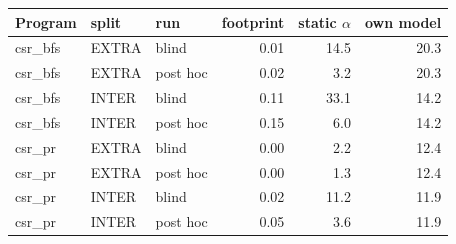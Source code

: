 \begin{tabular}{lllrrr}
\toprule
Program & split & run & footprint & static $\alpha$ & own model \\
\midrule
csr\_bfs & EXTRA & blind & 0.01 & 14.5 & 20.3 \\
csr\_bfs & EXTRA & post hoc & 0.02 & 3.2 & 20.3 \\
csr\_bfs & INTER & blind & 0.11 & 33.1 & 14.2 \\
csr\_bfs & INTER & post hoc & 0.15 & 6.0 & 14.2 \\
csr\_pr & EXTRA & blind & 0.00 & 2.2 & 12.4 \\
csr\_pr & EXTRA & post hoc & 0.00 & 1.3 & 12.4 \\
csr\_pr & INTER & blind & 0.02 & 11.2 & 11.9 \\
csr\_pr & INTER & post hoc & 0.05 & 3.6 & 11.9 \\
\bottomrule
\end{tabular}
